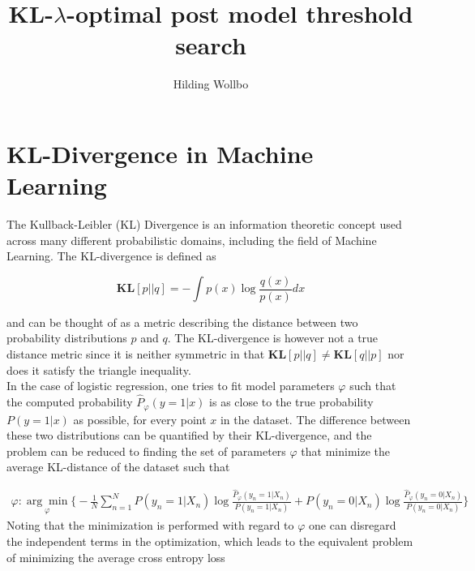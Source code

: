 \documentclass{article}
\begin{document}
\date{}
\title{KL-$\lambda$-optimal post model threshold search}
\author{Hilding Wollbo}
\maketitle
\vspace{-0.5cm}

\section{KL-Divergence in Machine Learning}

The Kullback-Leibler (KL) Divergence is an information theoretic concept used across many different probabilistic domains, including the field of Machine Learning. The KL-divergence is defined as

\begin{equation}
\textbf{KL}[p \vert\vert q] = -\int p(x) \log \frac{q(x)}{p(x)} dx
\end{equation}

and can be thought of as a metric describing the distance between two probability distributions $p$ and $q$. The KL-divergence is however not a true distance metric since it is neither symmetric in that $\textbf{KL}[p \vert\vert q] \neq \textbf{KL}[q \vert\vert p]$ nor does it satisfy the triangle inequality. \\

In the case of logistic regression, one tries to fit model parameters $\varphi$ such that the computed probability $\hat{P}_\varphi(y=1\vert x) $ is as close to the true probability $P(y=1\vert x)$ as possible, for every point $x$ in the dataset. The difference between these two distributions can be quantified by their KL-divergence, and the problem can be reduced to finding the set of parameters $\varphi$ that minimize the average KL-distance of the dataset such that

\begin{align}
    \varphi: \underset{\varphi}{\arg\min} \Big \{ -\frac{1}{N} \sum_{n=1}^N P(y_n=1\vert X_n) \log \frac{\hat{P}_\varphi(y_n=1\vert X_n)}{P(y_n=1\vert X_n)} + P(y_n=0\vert X_n) \log \frac{\hat{P}_\varphi(y_n=0\vert X_n)}{P(y_n=0\vert X_n)} \Big \}
\end{align}
Noting that the minimization is performed with regard to $\varphi$ one can disregard the independent terms in the optimization, which leads to the equivalent problem of minimizing the average cross entropy loss
\end{document}
